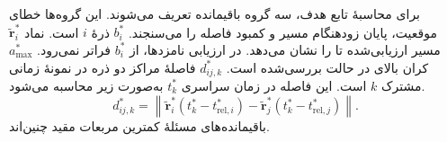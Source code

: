 برای محاسبهٔ تابع هدف، سه گروه باقیمانده تعریف می‌شوند.
این گروه‌ها خطای موقعیت، پایان زودهنگام مسیر و کمبود فاصله را می‌سنجند.
$b_i^*$  ذرهٔ $i$ است.
نماد $\widetilde{\mathbf r}_i^*$ مسیر ارزیابی‌شده تا  را نشان می‌دهد.
در ارزیابی نامزدها،  از $b_i^*$ فراتر نمی‌رود.
$a_{\max}^*$ کران بالای  در حالت بررسی‌شده است.
$d_{ij,k}^*$ فاصلهٔ مراکز دو ذره در نمونهٔ زمانی مشترک $k$ است.
این فاصله در زمان سراسری $t_k^*$ به‌صورت زیر محاسبه می‌شود.
\[
d_{ij,k}^*=
\left\|
\widetilde{\mathbf r}_i^*(t_k^*-t_{\mathrm{rel},i}^*)-
\widetilde{\mathbf r}_j^*(t_k^*-t_{\mathrm{rel},j}^*)
\right\|.
\]
باقیمانده‌های مسئلهٔ کمترین مربعات مقید چنین‌اند.

